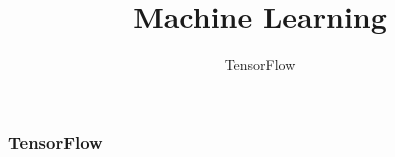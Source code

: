 \documentclass{formation}
\title{Machine Learning}
\subtitle{TensorFlow}
\begin{document}
\begin{frame}
  \frametitle{TensorFlow}
\end{frame}
\end{document}
